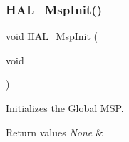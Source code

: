 \subsubsection{\texorpdfstring{H\+A\+L\+\_\+\+Msp\+Init()}{HAL\_MspInit()}}
{\footnotesize\ttfamily void H\+A\+L\+\_\+\+Msp\+Init (\begin{DoxyParamCaption}\item[{void}]{ }\end{DoxyParamCaption})}



Initializes the Global M\+SP. 


\begin{DoxyRetVals}{Return values}
{\em None} & \\
\hline
\end{DoxyRetVals}
